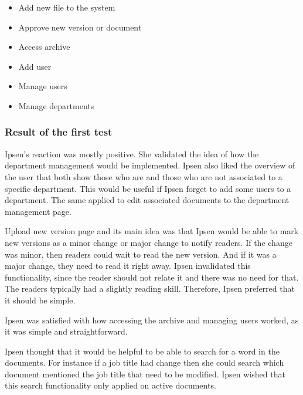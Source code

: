 \begin{itemize}
	\item Add new file to the system
	\item Approve new version or document
	\item Access archive
	\item Add user
	\item Manage users
	\item Manage departments
\end{itemize}

\subsubsection*{Result of the first test}
Ipsen's reaction was mostly positive.
She validated the idea of how the department management would be implemented.
Ipsen also liked the overview of the user that both show those who are and those who are not associated to a specific department.
This would be useful if Ipsen forget to add some users to a department.
The same applied to edit associated documents to the department management page.

Upload new version page and its main idea was that Ipsen would be able to mark new versions as a minor change or major change to notify readers. 
If the change was minor, then readers could wait to read the new version.
And if it was a major change, they need to read it right away.
Ipsen invalidated this functionality, since the reader should not relate it and there was no need for that. %
The readers typically had a slightly reading skill.
Therefore, Ipsen preferred that it should be simple.

Ipsen was satisfied with how accessing the archive and managing users worked, as it was simple and straightforward.

Ipsen thought that it would be helpful to be able to search for a word in the documents.
For instance if a job title had change then she could search which document mentioned the job title that need to be modified. 
Ipsen wished that this search functionality only applied on active documents.

